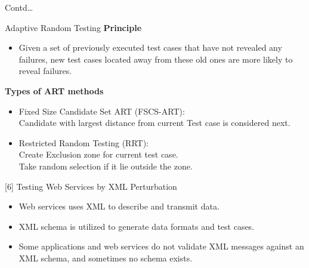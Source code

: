 \documentclass{bredelebeamer}
\begin{document}
\begin{frame}{Contd\dots}
	\begin{block}{Adaptive Random Testing}
		\textbf{Principle}
		\begin{itemize}
			\large
			\item Given a set of previously executed test cases
			that have not revealed any failures, new test cases
			located away from these old ones are more likely to
			reveal failures.
		\end{itemize}
		\textbf{Types of ART methods}
		\begin{itemize}
			\large
			\item Fixed Size Candidate Set ART (FSCS-ART):\\
			Candidate with largest distance from current Test case is considered next.
			\item Restricted Random Testing (RRT):\\
			Create Exclusion zone for current test case.\\
			Take random selection if it lie outside the zone.
		\end{itemize}
		
	\end{block}
\end{frame}

\begin{frame}{[6] Testing Web Services by XML Perturbation}
	\begin{itemize}
		\large
		\item Web services uses XML to describe and transmit data.
		\newline
		\item XML schema is utilized to generate data formats and test cases.\newline
		\item Some applications and web services do not validate XML messages against an XML schema, and sometimes no schema exists.
		
	\end{itemize}
	
\end{frame}
\end{document}
